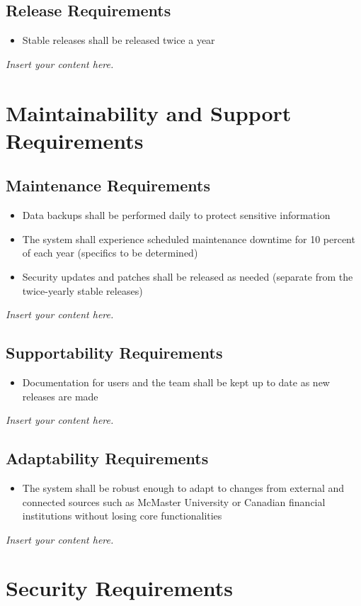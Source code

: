 \documentclass[12pt]{article}
\newcommand{\lips}{\textit{Insert your content here.}}
\begin{document}
\subsection{Release Requirements}
\begin{itemize}
    \item Stable releases shall be released twice a year
\end{itemize}
\lips

\section{Maintainability and Support Requirements}
\subsection{Maintenance Requirements}
\begin{itemize}
    \item Data backups shall be performed daily to protect sensitive information
    \item The system shall experience scheduled maintenance downtime for 10 percent of each year (specifics to be determined)
    \item Security updates and patches shall be released as needed (separate from the twice-yearly stable releases)
\end{itemize}
\lips
\subsection{Supportability Requirements}
\begin{itemize}
    \item Documentation for users and the team shall be kept up to date as new releases are made
\end{itemize}
\lips
\subsection{Adaptability Requirements}
\begin{itemize}
    \item The system shall be robust enough to adapt to changes from external and connected sources such as McMaster University or Canadian financial institutions without losing core functionalities
\end{itemize}
\lips

\section{Security Requirements}
\end{document}
